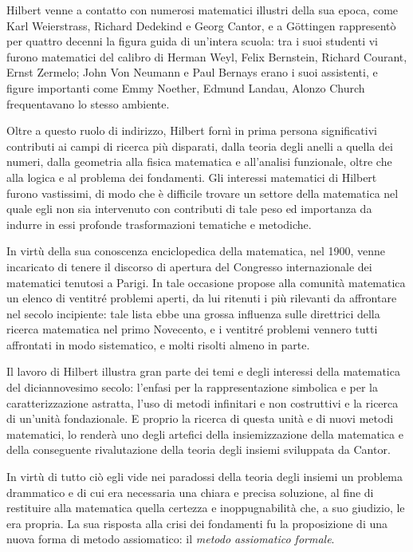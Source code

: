 Hilbert venne a contatto con numerosi matematici illustri della sua epoca, come Karl Weierstrass, Richard Dedekind e Georg Cantor, e a G\"ottingen rappresentò per quattro decenni la figura guida di un'intera scuola: tra i suoi studenti vi furono matematici del calibro di Herman Weyl, Felix Bernstein, Richard Courant, Ernst Zermelo; John Von Neumann e Paul Bernays erano i suoi assistenti, e figure importanti come Emmy Noether, Edmund Landau, Alonzo Church frequentavano lo stesso ambiente.

Oltre a questo ruolo di indirizzo, Hilbert fornì in prima persona significativi contributi ai campi di ricerca più disparati, dalla teoria degli anelli a quella dei numeri, dalla geometria alla fisica matematica e all'analisi funzionale, oltre che alla logica e al problema dei fondamenti.
Gli interessi matematici di Hilbert furono vastissimi, di modo che è difficile trovare un settore della matematica nel quale egli non sia intervenuto con contributi di tale peso ed importanza da indurre in essi profonde trasformazioni tematiche e metodiche.

In virtù della sua conoscenza enciclopedica della matematica, nel 1900, venne incaricato di tenere il discorso di apertura del Congresso internazionale dei ma\-te\-ma\-ti\-ci tenutosi a Parigi. In tale occasione propose alla comunità ma\-te\-ma\-ti\-ca un elenco di ventitré problemi aperti, da lui ritenuti i più rilevanti da affrontare nel secolo incipiente: tale lista ebbe una grossa influenza sulle direttrici della ricerca matematica nel primo Novecento, e i ventitré problemi vennero tutti affrontati in modo sistematico, e molti risolti almeno in parte.

Il lavoro di Hilbert illustra gran parte dei temi e degli interessi della ma\-te\-ma\-ti\-ca del diciannovesimo secolo: l'enfasi per la rappresentazione simbolica e per la caratterizzazione astratta, l'uso di metodi infinitari e non costruttivi e la ricerca di un'unità fondazionale. E proprio la ricerca di questa unità e di nuovi metodi matematici, lo renderà uno degli artefici della insiemizzazione della matematica e della conseguente rivalutazione della teoria degli insiemi sviluppata da Cantor.

In virtù di tutto ciò egli vide nei paradossi della teoria degli insiemi un pro\-ble\-ma drammatico e di cui era necessaria una chiara e precisa soluzione, al fine di restituire alla matematica quella certezza e inoppugnabilità che, a suo giudizio, le era propria. La sua risposta alla crisi dei fondamenti fu la proposizione di una nuova forma di metodo assiomatico: il \emph{metodo assiomatico formale}.
\newpage



